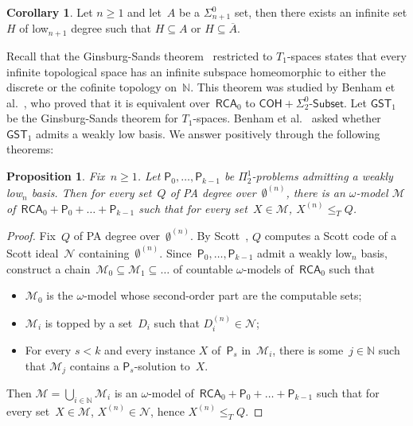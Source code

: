 \documentclass{article}
\def\N{\mathcal{N}}
\def\NN{\mathbb{N}}
\def\M{\mathcal{M}}
\def\Psf{\mathsf{P}}
\newcommand{\Sub}[1]{{#1}\mbox{-}\mathsf{Subset}}
\newcommand{\RCA}{\mathsf{RCA}}
\newcommand{\COH}{\mathsf{COH}}
\newcommand{\GST}{\mathsf{GST}_1}
\numberwithin{theorem}{section}
\newtheorem{proposition}[theorem]{Proposition}
\theoremstyle{definition}
\newtheorem{corollary}[theorem]{Corollary}
\begin{document}
\begin{corollary}
Let $n \geq 1$ and let~$A$ be a $\Sigma_{n+1}^0$ set, then there exists an infinite set $H$ of low${}_{n+1}$ degree such that $H \subseteq A$ or $H \subseteq \overline{A}$.
\end{corollary}

Recall that the Ginsburg-Sands theorem~\cite{ginsburg1979minimal} restricted to $T_1$-spaces states that every infinite topological space has an infinite subspace homeomorphic to either the discrete or the cofinite topology on~$\NN$. This theorem was studied by Benham et al.~\cite{benham2024ginsburg}, who proved that it is equivalent over~$\RCA_0$ to $\COH + \Sub{\Sigma^0_2}$. Let $\GST$ be the Ginsburg-Sands theorem for $T_1$-spaces. Benham et al.~\cite{benham2024ginsburg} asked whether $\GST$ admits a weakly low basis. We answer positively through the following theorems:

\begin{proposition}\label{prop:weakly-low-jump-model}
Fix~$n \geq 1$. Let $\Psf_0, \dots, \Psf_{k-1}$ be $\Pi^1_2$-problems admitting a weakly low${}_n$ basis.
Then for every set~$Q$ of PA degree over~$\emptyset^{(n)}$, there is an $\omega$-model $\M$ of~$\RCA_0 + \Psf_0 + \dots + \Psf_{k-1}$
such that for every set~$X \in \M$, $X^{(n)} \leq_T Q$.
\end{proposition}
\begin{proof}
Fix~$Q$ of PA degree over~$\emptyset^{(n)}$. By Scott~\cite{scott1962algebra}, $Q$ computes a Scott code of a Scott ideal~$\N$ containing~$\emptyset^{(n)}$. Since~$\Psf_0, \dots, \Psf_{k-1}$ admit a weakly low${}_n$ basis, construct a chain~$\M_0 \subseteq \M_1 \subseteq \dots$ of countable $\omega$-models of~$\RCA_0$ such that
\begin{itemize}
    \item $\M_0$ is the $\omega$-model whose second-order part are the computable sets;
    \item $\M_i$ is topped by a set~$D_i$ such that $D_i^{(n)} \in \N$;
    \item For every $s < k$ and every instance $X$ of~$\Psf_s$ in~$\M_i$, there is some~$j \in \NN$ such that $\M_j$
    contains a $\Psf_s$-solution to~$X$.
\end{itemize}
Then $\M = \bigcup_{i \in \NN} \M_i$ is an $\omega$-model of~$\RCA_0 + \Psf_0 + \dots + \Psf_{k-1}$
such that for every set~$X \in \M$, $X^{(n)} \in \N$, hence $X^{(n)} \leq_T Q$.
\end{proof}
\end{document}

